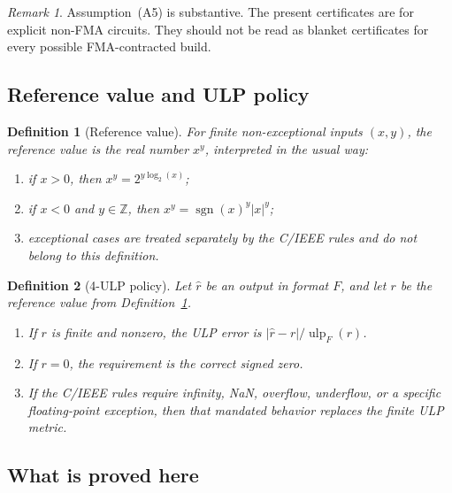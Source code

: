 \documentclass[11pt]{article}
\theoremstyle{plain}
\newtheorem{definition}{Definition}
\theoremstyle{remark}
\newtheorem{remark}{Remark}
\newcommand{\ulp}{\operatorname{ulp}}
\begin{document}
\begin{remark}
Assumption~(A5) is substantive.  The present certificates are for explicit
non-FMA circuits.  They should not be read as blanket certificates for every
possible FMA-contracted build.
\end{remark}

\subsection{Reference value and ULP policy}

\begin{definition}[Reference value]
\label{def:reference}
For finite non-exceptional inputs $(x,y)$, the reference value is the real
number $x^y$, interpreted in the usual way:
\begin{enumerate}[label=(R\arabic*)]
  \item if $x>0$, then $x^y = 2^{y\log_2(x)}$;
  \item if $x<0$ and $y \in \mathbb{Z}$, then
    $x^y = \operatorname{sgn}(x)^y |x|^y$;
  \item exceptional cases are treated separately by the C/IEEE rules and do
    not belong to this definition.
\end{enumerate}
\end{definition}

\begin{definition}[4-ULP policy]
\label{def:ulp-policy}
Let $\widehat{r}$ be an output in format $F$, and let $r$ be the reference
value from Definition~\ref{def:reference}.
\begin{enumerate}[label=(U\arabic*)]
  \item If $r$ is finite and nonzero, the ULP error is
    $|\widehat{r} - r|/\ulp_F(r)$.
  \item If $r=0$, the requirement is the correct signed zero.
  \item If the C/IEEE rules require infinity, NaN, overflow, underflow, or a
    specific floating-point exception, then that mandated behavior replaces
    the finite ULP metric.
\end{enumerate}
\end{definition}

\subsection{What is proved here}
\end{document}
